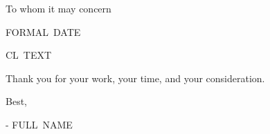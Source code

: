 \documentclass{resume} %
\begin{document}
  \begin{rSection}{To whom it may concern}

    FORMAL~DATE \newline 
      
    CL~TEXT \newline 

    Thank you for your work, your time, and your consideration. \newline 

    Best, 

    - FULL~NAME

  \end{rSection}
\end{document}
